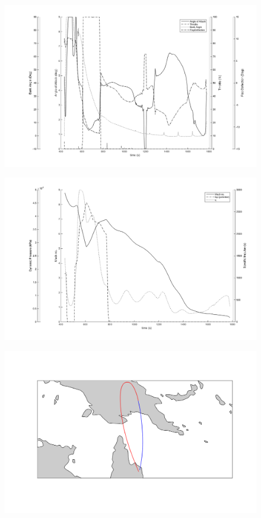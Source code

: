 \begin{figure}
	\centering
	\includegraphics[width=0.7\linewidth]{figures/7_Full/FlyBack2}
	\caption{}
	\label{fig:flyback2}
\end{figure}


\begin{figure}
	\centering
	\includegraphics[width=0.7\linewidth]{figures/7_Full/FlyBack3}
	\caption{}
	\label{fig:flyback3}
\end{figure}

\begin{figure}
	\centering
	\includegraphics[width=0.7\linewidth]{figures/7_Full/groundtrack}
	\caption{}
	\label{fig:groundtrack}
\end{figure}



